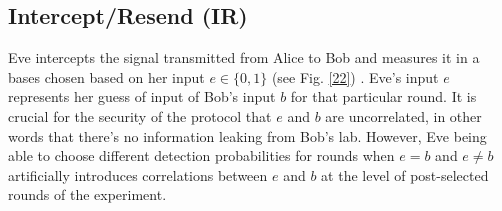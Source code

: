 \documentclass[smallextended]{svjour3}
\begin{document}
\subsection{\label{sec:level2}Intercept/Resend (IR)}
 Eve intercepts the signal transmitted from Alice to Bob and measures it in a bases chosen based on her input $e\in \{0,1\}$ (see Fig. \ref{22}) \cite{IR1,IR2}. Eve's input $e$ represents her guess of input of Bob's input $b$ for that particular round. It is crucial for the security of the protocol that $e$ and $b$ are uncorrelated, in other words that there's no information leaking from Bob's lab. However, Eve being able to choose different detection probabilities for rounds when $e=b$ and $e\neq b$ artificially introduces correlations between $e$ and $b$ at the level of post-selected rounds of the experiment.
\end{document}
